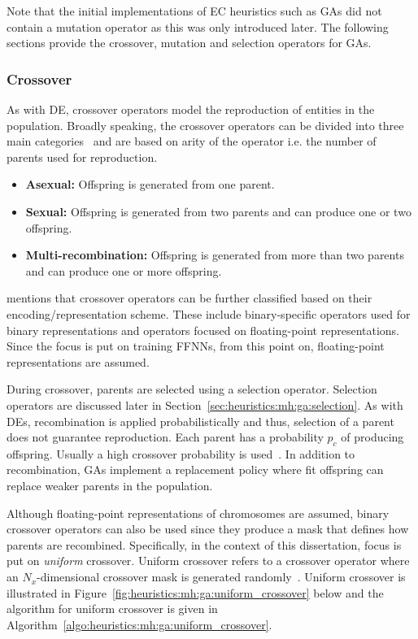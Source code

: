 Note that the initial implementations of \ac{EC} heuristics such as \acp{GA} did not contain a mutation operator as this was only introduced later. The following sections provide the crossover, mutation and selection operators for \acp{GA}.

\subsubsection{Crossover}
\label{sec:heuristics:mh:ga:crossover}

As with \ac{DE}, crossover operators model the reproduction of entities in the population. Broadly speaking, the crossover operators can be divided into three main categories~\cite{ref:engelbrecht:2007} and are based on arity of the operator i.e. the number of parents used for reproduction.

\begin{itemize}
      \item \textbf{Asexual: } Offspring is generated from one parent.

      \item \textbf{Sexual: } Offspring is generated from two parents and can produce one or two offspring.

      \item \textbf{Multi-recombination: } Offspring is generated from more than two parents and can produce one or more offspring.
\end{itemize}

\citeauthor{ref:engelbrecht:2007}\cite{ref:engelbrecht:2007} mentions that crossover operators can be further classified based on their encoding/representation scheme. These include binary-specific operators used for binary representations and operators focused on floating-point representations. Since the focus is put on training \acp{FFNN}, from this point on, floating-point representations are assumed.

During crossover, parents are selected using a selection operator. Selection operators are discussed later in Section~\ref{sec:heuristics:mh:ga:selection}. As with \acp{DE}, recombination is applied probabilistically and thus, selection of a parent does not guarantee reproduction. Each parent has a probability $p_{c}$ of producing offspring. Usually a high crossover probability is used~\cite{ref:engelbrecht:2007}. In addition to recombination, \acp{GA} implement a replacement policy where fit offspring can replace weaker parents in the population.

Although floating-point representations of chromosomes are assumed, binary crossover operators can also be used since they produce a mask that defines how parents are recombined. Specifically, in the context of this dissertation, focus is put on \textit{uniform} crossover. Uniform crossover refers to a crossover operator where an $N_{x}$-dimensional crossover mask is generated randomly~\cite{ref:syswerda:1989}. Uniform crossover is illustrated in Figure~\ref{fig:heuristics:mh:ga:uniform_crossover} below and the algorithm for uniform crossover is given in Algorithm~\ref{algo:heuristics:mh:ga:uniform_crossover}.


